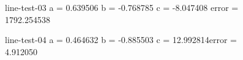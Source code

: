 \begin{figure}
\begin{minipage}[t]{0.32\linewidth}
		\caption{line-test-03 \break a = 0.639506 \break b = -0.768785 \break c = -8.047408 \break error = 1792.254538}
	\end{minipage}
	\hfill
	\begin{minipage}[t]{0.32\linewidth}
		\centering
		\caption{line-test-04 \break a = 0.464632 \break b = -0.885503 \break c = 12.992814\break error = 4.912050}
	\end{minipage}
\end{figure}

